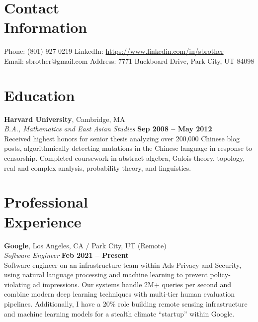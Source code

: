 \documentclass[margin,line]{resume}
\begin{document}
\begin{resume}
    \section{\mysidestyle Contact\\Information}

    Phone: (801) 927-0219       \hfill LinkedIn: \url{https://www.linkedin.com/in/sbrother} \\
    \noindent Email: sbrother@gmail.com  \hfill Address: 7771 Buckboard Drive, Park City, UT 84098 \vspace{0mm}\\\vspace{-4.5mm}

    \section{\mysidestyle Education}

    \textbf{Harvard University}, Cambridge, MA \vspace{2mm}\\\vspace{1mm}%
    \textsl{B.A., Mathematics and East Asian Studies} \hfill \textbf{Sep 2008 -- May 2012}\\
    Received highest honors for senior thesis analyzing over 200,000 Chinese
    blog posts, algorithmically detecting mutations in the Chinese language in
    response to censorship. Completed coursework in abstract algebra,
    Galois theory, topology, real and complex analysis, probability theory, and
    linguistics.

    \section{\mysidestyle Professional\\Experience}

    \textbf{Google}, Los Angeles, CA / Park City, UT (Remote)  \vspace{2mm}\\\vspace{1mm}%
    \textsl{Software Engineer} \hfill \textbf{Feb 2021 -- Present}\\
    Software engineer on an infrastructure team within Ads Privacy and Security,
    using natural language processing and machine learning to prevent
    policy-violating ad impressions. Our systems handle 2M+ queries per second
    and combine modern deep learning techniques with multi-tier human
    evaluation pipelines. Additionally, I have a 20\% role building
    remote sensing infrastructure and machine learning models for a stealth
    climate ``startup'' within Google.


\end{resume}
\end{document}
